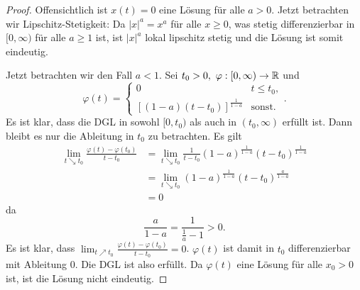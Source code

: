 \begin{proof}
	Offensichtlich ist $x(t)=0$ eine L\"{o}sung f\"{u}r alle $a>0$. Jetzt betrachten wir Lipschitz-Stetigkeit: Da $|x|^a = x^a$ f\"{u}r alle $x\ge 0$, was stetig differenzierbar in $[0,\infty)$ f\"{u}r alle $a\ge 1$ ist, ist $|x|^a$ lokal lipschitz stetig und die L\"{o}sung ist somit eindeutig. 

	Jetzt betrachten wir den Fall $a<1$. Sei $t_0>0,~\varphi:[0,\infty)\to \mathbb{R}$ und
	\[
	\varphi(t) = \begin{cases}
		0 & t \le t_0,\\
		[(1-a)(t-t_0)]^{\frac{1}{1-a}} & \text{sonst.}
	\end{cases}
	.\] 
	Es ist klar, dass die DGL in sowohl $[0,t_0)$ als auch in $(t_0,\infty)$ erf\"{u}llt ist. Dann bleibt es nur die Ableitung in $t_0$ zu betrachten. Es gilt
	\begin{align*}
		\lim_{t \searrow t_0} \frac{\varphi(t)-\varphi(t_0)}{t-t_0}&=\lim_{t \searrow t_0} \frac{1}{t-t_0}(1-a)^{\frac{1}{1-a}}(t-t_0)^{\frac{1}{1-a}}\\
		&=\lim_{t \searrow t_0} (1-a)^{\frac{1}{1-a}}(t-t_0)^{\frac{a}{1-a}}\\	&= 0
	\end{align*}
	da
	\[
	\frac{a}{1-a}=\frac{1}{\frac{1}{a}-1}>0
	.\] 
	Es ist klar, dass $\lim_{t \nearrow t_0} \frac{\varphi(t)-\varphi(t_0)}{t-t_0}=0$. $\varphi(t)$ ist damit in $t_0$ differenzierbar mit Ableitung $0$. Die DGL ist also erf\"{u}llt. Da $\varphi(t)$ eine L\"{o}sung f\"{u}r alle $x_0>0$ ist, ist die L\"{o}sung nicht eindeutig.
\end{proof}
